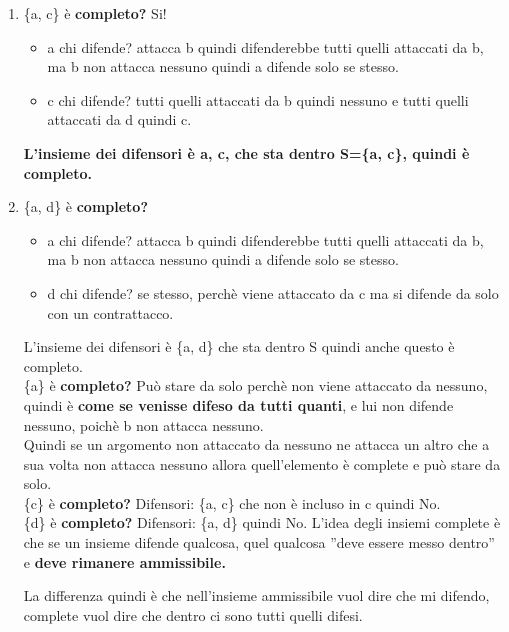 \begin{enumerate}
    \item \{a, c\} è \textbf{completo?} Si!
    \begin{itemize}
        \item a chi difende? attacca b quindi difenderebbe tutti quelli attaccati da b, ma b non attacca nessuno quindi a difende solo se stesso.
        \item c chi difende? tutti quelli attaccati da b quindi nessuno e tutti quelli attaccati da d quindi c.
    \end{itemize}
\textbf{L’insieme dei difensori è a, c, che sta dentro S=\{a, c\}, quindi è completo.}
\newpage
    \item \{a, d\} è \textbf{completo?}
    \begin{itemize}
        \item a chi difende? attacca b quindi difenderebbe tutti quelli attaccati da b, ma b non attacca nessuno quindi a difende solo se stesso.
        \item d chi difende? se stesso, perchè viene attaccato da c ma si difende da solo con un contrattacco.
    \end{itemize}
    L’insieme dei difensori è \{a, d\} che sta dentro S quindi anche questo è completo.
    \\\{a\} è \textbf{completo?} Può stare da solo perchè non viene attaccato da nessuno, quindi è \textbf{come se venisse difeso da tutti quanti}, e lui non difende nessuno, poichè b non attacca nessuno. 
    \\Quindi se un argomento non attaccato da nessuno ne attacca un altro che a sua volta non attacca nessuno allora quell’elemento è complete e può stare da solo.
    \\\{c\} è \textbf{completo?} Difensori: \{a, c\} che non è incluso in c quindi No.
    \\\{d\} è \textbf{completo?} Difensori: \{a, d\} quindi No. L’idea degli insiemi complete è che se un insieme difende qualcosa, quel qualcosa ”deve essere messo dentro” e \textbf{deve rimanere ammissibile.}
    
    \vspace{0.8cm}
    
    La differenza quindi è che nell’insieme ammissibile vuol dire che mi difendo, complete vuol dire che dentro ci sono tutti quelli difesi.
\end{enumerate}
\newpage
